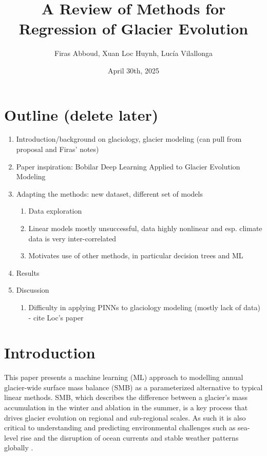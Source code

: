 \documentclass{article}
\title{A Review of Methods for Regression of Glacier Evolution}
\author{Firas Abboud, Xuan Loc Huynh, Luc\'ia Vilallonga}
\date{April 30th, 2025}
\begin{document}
\maketitle


\section{Outline (delete later)}

\begin{enumerate}
    \item Introduction/background on glaciology, glacier modeling (can pull from proposal and Firas' notes)
    \item Paper inspiration: Bobilar Deep Learning Applied to Glacier Evolution Modeling \cite{Bobilar:etal:2020}
    \item Adapting the methods: new dataset, different set of models
    \begin{enumerate}
        \item Data exploration
        \item Linear models mostly unsuccessful, data highly nonlinear and esp. climate data is very inter-correlated
        \item Motivates use of other methods, in particular decision trees and ML
    \end{enumerate}
    \item Results
    \item Discussion
    \begin{enumerate}
        \item Difficulty in applying PINNs to glaciology modeling (mostly lack of data) - cite Loc's paper
    \end{enumerate}
\end{enumerate}


\section{Introduction}

This paper presents a machine learning (ML) approach to modelling annual glacier-wide surface mass balance (SMB) 
as a parameterized alternative to typical linear methods. SMB, which describes the difference between a glacier’s 
mass accumulation in the winter and ablation in the summer, is a key process that drives glacier evolution on 
regional and sub-regional scales. As such it is also critical to understanding and predicting environmental 
challenges such as sea-level rise and the disruption of ocean currents and stable weather patterns globally \cite{earth:org}. \\
\end{document}
